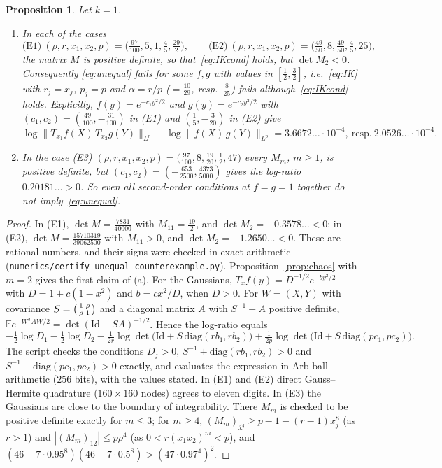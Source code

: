 \documentclass[11pt]{amsart}
\newtheorem{proposition}[theorem]{Proposition}
\theoremstyle{definition}
\newcommand{\E}{\mathbb{E}}
\newcommand{\Id}{\mathrm{Id}}
\begin{document}
\begin{proposition}\label{prop:counter}
Let $k=1$.
\begin{enumerate}[label=(\alph*)]
\item In each of the cases
\[
\text{(E1)}\ (\rho,r,x_1,x_2,p)=\big(\tfrac{97}{100},5,1,\tfrac45,\tfrac{29}2\big),\qquad
\text{(E2)}\ (\rho,r,x_1,x_2,p)=\big(\tfrac{49}{50},8,\tfrac{49}{50},\tfrac45,25\big),
\]
the matrix $M$ is positive definite, so that~\eqref{eq:IKcond} holds, but $\det M_2<0$. Consequently
\eqref{eq:unequal} fails for some $f,g$ with values in $[\frac12,\frac32]$, i.e.\ \eqref{eq:IK} with $r_j=x_j$,
$p_j=p$ and $\alpha=r/p$ ($=\frac{10}{29}$, resp.\ $\frac8{25}$) fails although~\eqref{eq:IKcond} holds. Explicitly,
$f(y)=e^{-c_1y^2/2}$ and $g(y)=e^{-c_2y^2/2}$ with $(c_1,c_2)=(\frac{49}{100},-\frac{31}{100})$ in (E1) and
$(\frac15,-\frac3{20})$ in (E2) give
\[
\log\big\|T_{x_1}f(X)\,T_{x_2}g(Y)\big\|_{L^r}-\log\big\|f(X)\,g(Y)\big\|_{L^p}=3.6672\ldots\cdot10^{-4},\ \text{resp.}\
2.0526\ldots\cdot10^{-4}.
\]
\item In the case (E3) $(\rho,r,x_1,x_2,p)=\big(\tfrac{97}{100},8,\tfrac{19}{20},\tfrac12,47\big)$ every $M_m$, $m\ge1$, is
positive definite, but $(c_1,c_2)=(-\frac{653}{2500},\frac{4373}{5000})$ gives the log-ratio $0.20181\ldots>0$. So even
all second-order conditions at $f=g=1$ together do not imply~\eqref{eq:unequal}.
\end{enumerate}
\end{proposition}

\begin{proof}
In (E1), $\det M=\frac{7831}{40000}$ with $M_{11}=\frac{19}2$, and $\det M_2=-0.3578\ldots<0$; in (E2),
$\det M=\frac{15710319}{39062500}$ with $M_{11}>0$, and $\det M_2=-1.2650\ldots<0$. These are rational numbers, and their
signs were checked in exact arithmetic (\texttt{numerics/certify\_unequal\_counterexample.py}).
Proposition~\ref{prop:chaos} with $m=2$ gives the first claim of (a). For the Gaussians, $T_xf(y)=D^{-1/2}e^{-by^2/2}$
with $D=1+c(1-x^2)$ and $b=cx^2/D$, when $D>0$. For $W=(X,Y)$ with covariance
$S=\begin{psmallmatrix}1&\rho\\\rho&1\end{psmallmatrix}$ and a diagonal matrix $A$ with $S^{-1}+A$ positive definite,
$\E e^{-W^TAW/2}=\det(\Id+SA)^{-1/2}$. Hence the log-ratio equals
\[
-\tfrac12\log D_1-\tfrac12\log D_2-\tfrac1{2r}\log\det\big(\Id+S\,\mathrm{diag}(rb_1,rb_2)\big)
+\tfrac1{2p}\log\det\big(\Id+S\,\mathrm{diag}(pc_1,pc_2)\big).
\]
The script checks the conditions $D_j>0$, $S^{-1}+\mathrm{diag}(rb_1,rb_2)>0$ and $S^{-1}+\mathrm{diag}(pc_1,pc_2)>0$
exactly, and evaluates the expression in Arb ball arithmetic ($256$ bits), with the values stated. In (E1) and (E2)
direct Gauss--Hermite quadrature ($160\times160$ nodes) agrees to eleven digits. In (E3) the Gaussians are close to the
boundary of integrability. There $M_m$ is checked to be positive definite exactly for $m\le3$; for $m\ge4$,
$(M_m)_{jj}\ge p-1-(r-1)x_j^8$ (as $r>1$) and $|(M_m)_{12}|\le p\rho^4$ (as $0<r(x_1x_2)^m<p$), and
$(46-7\cdot0.95^8)(46-7\cdot0.5^8)>(47\cdot0.97^4)^2$.
\end{proof}
\end{document}
